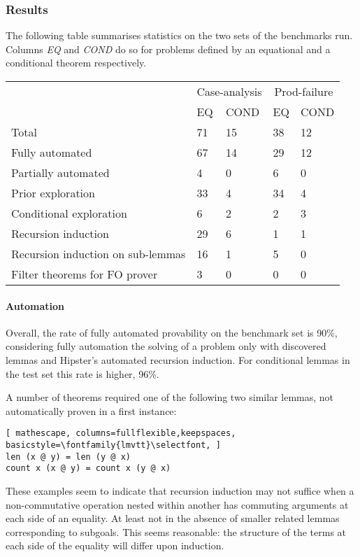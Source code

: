 \subsubsection{Results}

The following table summarises statistics on the two sets of the benchmarks run.
%
Columns \emph{EQ} and \emph{COND} do so for problems defined by an equational and a conditional theorem respectively.

\begin{tabularx}{\textwidth}{l | X X | X X}
  & \multicolumn{2}{c|}{Case-analysis} & \multicolumn{2}{c}{Prod-failure} \\
  &  EQ & COND & EQ & COND \\
  \hline
  Total & 71 & 15 & 38 & 12 \\
  \hline
  Fully automated & 67 & 14 & 29 & 12 \\
  Partially automated & 4 & 0 & 6 & 0 \\
  \hline
  Prior exploration & 33 & 4 & 34 & 4 \\
  Conditional exploration & 6 & 2 & 2 & 3 \\
  \hline
  Recursion induction & 29 & 6 & 1 & 1 \\
  Recursion induction on sub-lemmas & 16 & 1 & 5 & 0 \\
  \hline
  Filter theorems for FO prover & 3 & 0 & 0 & 0 \\ %
\end{tabularx}

\paragraph{Automation}
%
Overall, the rate of fully automated provability on the benchmark set is 90\%, considering fully automation the solving of a problem only with discovered lemmas and Hipster's automated recursion induction.
%
For conditional lemmas in the test set this rate is higher, 96\%.

A number of theorems required one of the following two similar lemmas, not automatically proven in a first instance:

\begin{lstlisting}[ mathescape, columns=fullflexible,keepspaces, basicstyle=\fontfamily{lmvtt}\selectfont, ]
len (x @ y) = len (y @ x)
count x (x @ y) = count x (y @ x)
\end{lstlisting}

\noindent These examples seem to indicate that recursion induction may not suffice when a non-commutative operation nested within another has commuting arguments at each side of an equality.
%
At least not in the absence of smaller related lemmas corresponding to subgoals.
%
This seems reasonable: the structure of the terms at each side of the equality will differ upon induction.

